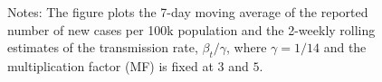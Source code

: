 \documentclass[12pt]{article}
\begin{document}
\begin{figure}[!p]
\vspace{-0.4cm}%
\footnotesize
{}Notes: The figure plots the 7-day moving average of the reported number of
new cases per 100k population and the 2-weekly rolling estimates of the
transmission rate, $\beta_{t}/\gamma$, where $\gamma=1/14$ and the
multiplication factor (MF) is fixed at $3$ and $5$.%

\end{figure}%
%

\addtocounter{figure}{-1}%
%
\end{document}
